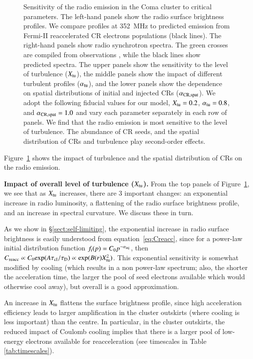 \documentclass[fleqn,usenatbib,useAMS]{mnras}
\begin{document}
\begin{figure}
\caption{Sensitivity of the radio emission in the Coma cluster to critical
  parameters. The left-hand panels show the radio surface brightness
  profiles. We compare profiles at 352~MHz \citep[blue
    crosses,][]{brown11} to predicted emission from Fermi-II
  reaccelerated CR electrons populations (black lines). The right-hand
  panels show radio synchrotron spectra. The green crosses are
  compiled from observations \citep{2010PhDT.......259P}, while the
  black lines show predicted spectra. The upper panels show the sensitivity to the level of
  turbulence ($X_{\mathrm{tu}}$), the middle panels show the impact of
  different turbulent profiles ($\alpha_{\mathrm{tu}}$), and the lower
  panels show the dependence on spatial distributions of initial and
  injected CRs ($\alpha_{\mathrm{CR,spat}}$). We adopt the following
  fiducial values for our model, $X_{\mathrm{tu}}=0.2$,
  $\alpha_{\mathrm{tu}}=0.8$, and $\alpha_{\mathrm{CR,spat}}=1.0$ and vary each
  parameter separately in each row of panels. We find that the radio
  emission is most sensitive to the level of turbulence. The abundance of CR seeds, and the spatial distribution of CRs and turbulence play second-order effects.}
  \label{fig:param_comp}
\end{figure}

Figure~\ref{fig:param_comp} shows the impact of turbulence and the
spatial distribution of CRs on the radio emission. 

{\bf Impact of overall level of turbulence ($X_{\rm tu}$).} From the top panels of Figure~\ref{fig:param_comp}, we see that as $X_{\rm tu}$ increases, there are 3 important changes: an exponential increase in radio luminosity, a flattening of the radio surface brightness profile, and an increase in spectral curvature. We discuss these in turn. 

As we show in \S\ref{sect:self-limiting}, the exponential increase in radio surface brightness is easily understood from equation~\ref{eq:Creacc}, since for a power-law initial distribution function $f_{\rm i}(p) = C_{\rm 0} p^{-\alpha_{{\mathrm{inj}}}}$, then $C_{\rm reacc} \propto C_{\rm 0} {\rm exp}(A \tau_{\rm cl}/\tau_{\rm D}) \propto {\rm exp} (B(r) X_{\rm tu}^{2})$. This exponential sensitivity is somewhat modified by cooling (which results in a non power-law spectrum; also, the shorter the acceleration time, the larger the pool of seed electrons available which would otherwise cool away), but overall is a good approximation.  

An increase in $X_{\rm tu}$ flattens the surface brightness profile, since high acceleration efficiency leads to larger amplification in the cluster outskirts (where cooling is less important) than the centre. In particular, in the cluster outskirts, the reduced impact of Coulomb cooling implies that there is a larger pool of low-energy electrons available for reacceleration (see timescales in Table \ref{tab:timescales}). 
\end{document}
